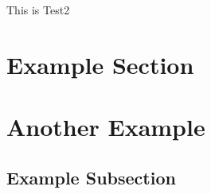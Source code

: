\documentclass[11 pt]{article}
\begin{document}
This is Test2

\section{Example Section}

\lipsum[1]

\section{Another Example}

\subsection{Example Subsection}
\label{sec:ThisIsALabelToSomethingInTest2}

\lipsum[1]
\end{document}
